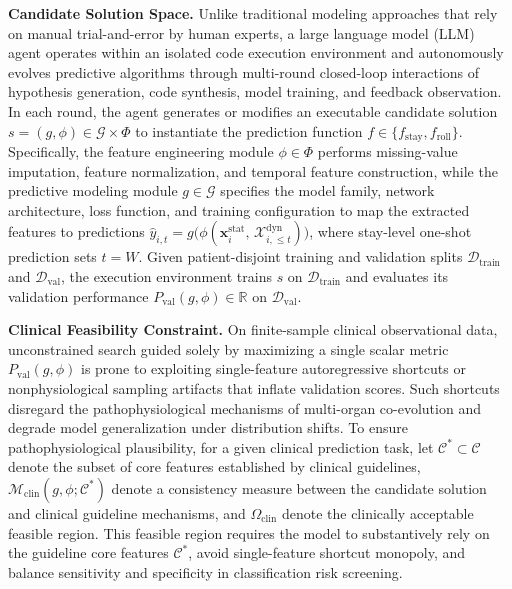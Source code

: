 \textbf{Candidate Solution Space.} Unlike traditional modeling approaches that rely on manual trial-and-error by human experts, a large language model (LLM) agent operates within an isolated code execution environment and autonomously evolves predictive algorithms through multi-round closed-loop interactions of hypothesis generation, code synthesis, model training, and feedback observation. In each round, the agent generates or modifies an executable candidate solution $s = (g, \phi) \in \mathcal{G} \times \Phi$ to instantiate the prediction function $f \in \{f_{\text{stay}}, f_{\text{roll}}\}$. Specifically, the feature engineering module $\phi \in \Phi$ performs missing-value imputation, feature normalization, and temporal feature construction, while the predictive modeling module $g \in \mathcal{G}$ specifies the model family, network architecture, loss function, and training configuration to map the extracted features to predictions $\hat{y}_{i,t} = g\big(\phi(\mathbf{x}_i^{\text{stat}},\, \mathcal{X}_{i, \le t}^{\text{dyn}})\big)$, where stay-level one-shot prediction sets $t = W$. Given patient-disjoint training and validation splits $\mathcal{D}_{\text{train}}$ and $\mathcal{D}_{\text{val}}$, the execution environment trains $s$ on $\mathcal{D}_{\text{train}}$ and evaluates its validation performance $P_{\text{val}}(g, \phi) \in \mathbb{R}$ on $\mathcal{D}_{\text{val}}$.

\textbf{Clinical Feasibility Constraint.} On finite-sample clinical observational data, unconstrained search guided solely by maximizing a single scalar metric $P_{\text{val}}(g, \phi)$ is prone to exploiting single-feature autoregressive shortcuts or nonphysiological sampling artifacts that inflate validation scores. Such shortcuts disregard the pathophysiological mechanisms of multi-organ co-evolution and degrade model generalization under distribution shifts. To ensure pathophysiological plausibility, for a given clinical prediction task, let $\mathcal{C}^* \subset \mathcal{C}$ denote the subset of core features established by clinical guidelines, $\mathcal{M}_{\text{clin}}(g, \phi; \mathcal{C}^*)$ denote a consistency measure between the candidate solution and clinical guideline mechanisms, and $\Omega_{\text{clin}}$ denote the clinically acceptable feasible region. This feasible region requires the model to substantively rely on the guideline core features $\mathcal{C}^*$, avoid single-feature shortcut monopoly, and balance sensitivity and specificity in classification risk screening.

